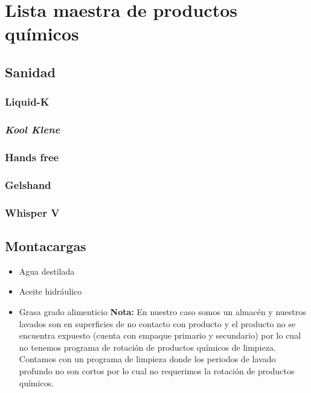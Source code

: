 \renewcommand{\MenorVer}{0}
\renewcommand{\MayorVer}{2}
\renewcommand{\Codigo}{HYS-25-L}
\renewcommand{\FechaPub}{2023--01}
\renewcommand{\Titulo}{Lista maestra de productos químicos}

\section{\Titulo}

\subsection{Sanidad}

\subsubsection{Liquid-K}


\subsubsection{\textit{Kool Klene}}


\subsubsection{Hands free}


\subsubsection{Gelshand}


\subsubsection{Whisper V}


\subsection{Montacargas}

\begin{itemize}
	\item Agua destilada
	\item Aceite hidráulico
	\item Grasa grado alimenticio
\textbf{Nota:} En nuestro caso somos un almacén y nuestros lavados son en superficies de no contacto con producto y el producto no se encuentra expuesto (cuenta con empaque primario y secundario) por lo cual no tenemos programa de rotación de productos químicos de limpieza. Contamos con un programa de limpieza donde los periodos de lavado profundo no son cortos por lo cual no requerimos la rotación de productos químicos.
\end{itemize}
